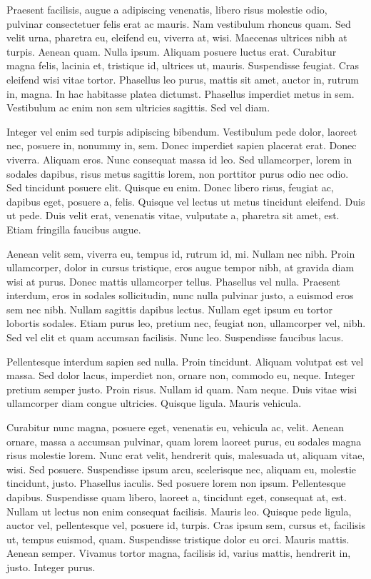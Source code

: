 \documentclass{article}
\begin{document}
Praesent facilisis, augue a adipiscing venenatis, libero risus molestie
odio, pulvinar consectetuer felis erat ac mauris. Nam vestibulum rhoncus quam.
Sed velit urna, pharetra eu, eleifend eu, viverra at, wisi. Maecenas ultrices
nibh at turpis. Aenean quam. Nulla ipsum. Aliquam posuere luctus erat.
Curabitur magna felis, lacinia et, tristique id, ultrices ut, mauris.
Suspendisse feugiat. Cras eleifend wisi vitae tortor. Phasellus leo purus,
mattis sit amet, auctor in, rutrum in, magna. In hac habitasse platea dictumst.
Phasellus imperdiet metus in sem. Vestibulum ac enim non sem ultricies
sagittis. Sed vel diam.

Integer vel enim sed turpis adipiscing bibendum. Vestibulum pede dolor,
laoreet nec, posuere in, nonummy in, sem. Donec imperdiet sapien placerat erat.
Donec viverra. Aliquam eros. Nunc consequat massa id leo. Sed ullamcorper,
lorem in sodales dapibus, risus metus sagittis lorem, non porttitor purus odio
nec odio. Sed tincidunt posuere elit. Quisque eu enim. Donec libero risus,
feugiat ac, dapibus eget, posuere a, felis. Quisque vel lectus ut metus
tincidunt eleifend. Duis ut pede. Duis velit erat, venenatis vitae, vulputate
a, pharetra sit amet, est. Etiam fringilla faucibus augue.

Aenean velit sem, viverra eu, tempus id, rutrum id, mi. Nullam nec nibh. Proin
ullamcorper, dolor in cursus tristique, eros augue tempor nibh, at gravida diam
wisi at purus. Donec mattis ullamcorper tellus. Phasellus vel nulla. Praesent
interdum, eros in sodales sollicitudin, nunc nulla pulvinar justo, a euismod
eros sem nec nibh. Nullam sagittis dapibus lectus. Nullam eget ipsum eu tortor
lobortis sodales. Etiam purus leo, pretium nec, feugiat non, ullamcorper vel,
nibh. Sed vel elit et quam accumsan facilisis. Nunc leo. Suspendisse faucibus
lacus.

Pellentesque interdum sapien sed nulla. Proin tincidunt. Aliquam volutpat
est vel massa. Sed dolor lacus, imperdiet non, ornare non, commodo eu, neque.
Integer pretium semper justo. Proin risus. Nullam id quam. Nam neque. Duis
vitae wisi ullamcorper diam congue ultricies. Quisque ligula. Mauris vehicula.

Curabitur nunc magna, posuere eget, venenatis eu, vehicula ac, velit. Aenean
ornare, massa a accumsan pulvinar, quam lorem laoreet purus, eu sodales magna
risus molestie lorem. Nunc erat velit, hendrerit quis, malesuada ut, aliquam
vitae, wisi. Sed posuere. Suspendisse ipsum arcu, scelerisque nec, aliquam eu,
molestie tincidunt, justo. Phasellus iaculis. Sed posuere lorem non ipsum.
Pellentesque dapibus. Suspendisse quam libero, laoreet a, tincidunt eget,
consequat at, est. Nullam ut lectus non enim consequat facilisis. Mauris leo.
Quisque pede ligula, auctor vel, pellentesque vel, posuere id, turpis. Cras
ipsum sem, cursus et, facilisis ut, tempus euismod, quam. Suspendisse tristique
dolor eu orci. Mauris mattis. Aenean semper. Vivamus tortor magna, facilisis
id, varius mattis, hendrerit in, justo. Integer purus.
\end{document}

